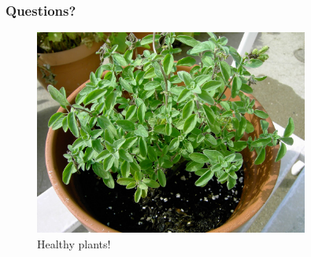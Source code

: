 \documentclass{beamer}
\begin{document}
\begin{frame}
    \frametitle{Questions?}
    \begin{figure}
        \includegraphics[width=9cm]{img/happy-plants}
        \caption{Healthy plants!}
    \end{figure}
\end{frame}
\end{document}
